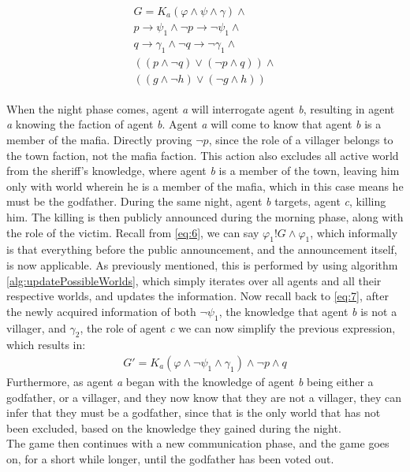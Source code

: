 \begin{align}
	\begin{split}
		G = K_a(\varphi \land \psi \land\gamma)\land                        \\
		p \rightarrow \psi_1 \land \neg p \rightarrow \neg \psi_1 \land     \\
		q \rightarrow \gamma_1 \land \neg q \rightarrow \neg \gamma_1 \land \\
		((p \land \neg q) \lor (\neg p \land q)) \land                      \\
		((g \land \neg h) \lor (\neg g \land h))
		\label{eq:7}
	\end{split}
\end{align}

When the night phase comes, agent \textit{a} will interrogate agent \textit{b},
resulting in agent \textit{a} knowing the faction of agent \textit{b}. Agent
\textit{a} will come to know that agent \textit{b} is a member of the mafia.
Directly proving $\neg p$, since the role of a villager belongs to the town
faction, not the mafia faction. This action also excludes all active world from
the sheriff's knowledge, where agent \textit{b} is a member of the town,
leaving him only with world wherein he is a member of the mafia, which in this
case means he must be the godfather. During the same night, agent \textit{b}
targets, agent \textit{c}, killing him. The killing is then publicly announced
during the morning phase, along with the role of the victim. Recall from
\cref{eq:6}, we can say $\varphi_1!G\land\varphi_1$, which informally is that
everything before the public announcement, and the announcement itself, is now
applicable. As previously mentioned, this is performed by using algorithm 
\ref{alg:updatePossibleWorlds}, which simply iterates over all agents and all 
their respective worlds, and updates the information. Now recall back to 
\cref{eq:7}, after the newly
acquired information of both $\neg \psi_1$, the knowledge that agent \textit{b}
is not a villager, and $\gamma_2$, the role of agent \textit{c} we can now
simplify the previous expression, which results in:
\begin{align}
	G' = K_a(\varphi \land \neg \psi_1 \land \gamma_1) \land \neg p \land q
\end{align}
Furthermore, as agent \textit{a} began with the knowledge of agent \textit{b}
being either a godfather, or a villager, and they now know that they are not a
villager, they can infer that they must be a godfather, since that is the only
world that has not been excluded, based on the knowledge they gained during the
night. \\
The game then continues with a new communication phase, and the game goes on,
for a short while longer, until the godfather has been voted out.
